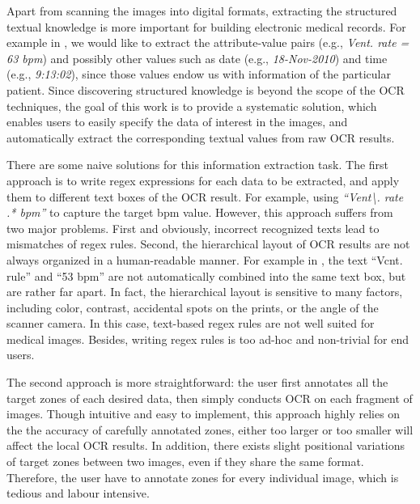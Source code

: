 Apart from scanning the images into digital formats,
extracting the structured textual knowledge is more important for
building electronic medical records.
For example in ,
we would like to extract the attribute-value pairs
(e.g., \textit{Vent. rate = 63 bpm}) and possibly other values such as
date (e.g., \textit{18-Nov-2010}) and time (e.g., \textit{9:13:02}),
since those values endow us with information of the particular patient.
Since discovering structured knowledge is beyond the scope of the OCR techniques,
the goal of this work is to provide a systematic solution,
which enables users to easily specify the data of interest in the images,
and automatically extract the corresponding textual values from raw OCR results.

There are some naive solutions for this information extraction task.
The first approach is to write regex expressions for each data to be extracted,
and apply them to different text boxes of the OCR result.
For example, using \textit{``Vent\textbackslash . rate .* bpm''}
to capture the target bpm value.
However, this approach suffers from two major problems.
First and obviously,
incorrect recognized texts lead to mismatches of regex rules.
Second, the hierarchical layout of OCR results are
not always organized in a human-readable manner.
For example in , the text ``Vcnt. rule'' and ``53 bpm''
are not automatically combined into the same text box, but are rather far apart.
In fact, the hierarchical layout is sensitive to many factors,
including color, contrast, accidental spots on the prints, or the angle of the scanner camera.
In this case, text-based regex rules are not well suited for medical images.
Besides, writing regex rules is too ad-hoc and non-trivial for end users.

The second approach is more straightforward:
the user first annotates all the target zones of each desired data,
then simply conducts OCR on each fragment of images.
Though intuitive and easy to implement,
this approach highly relies on the the accuracy of carefully annotated zones,
either too larger or too smaller will affect the local OCR results.
In addition, there exists slight positional variations of target zones
between two images, even if they share the same format.
Therefore, the user have to annotate zones for every individual image,
which is tedious and labour intensive.

